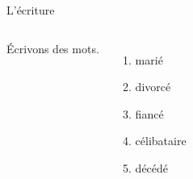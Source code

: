 \begin{frame}{L'écriture }
  \begin{columns}
      Écrivons des mots. \\
      \begin{enumerate}
        \item marié
        \item divorcé
        \item fiancé
        \item célibataire
        \item décédé
      \end{enumerate}
      \begin{minipage}[c][0.6\textheight]{\linewidth}
        \begin{center}
        \end{center}
      \end{minipage}
  \end{columns}
\end{frame}